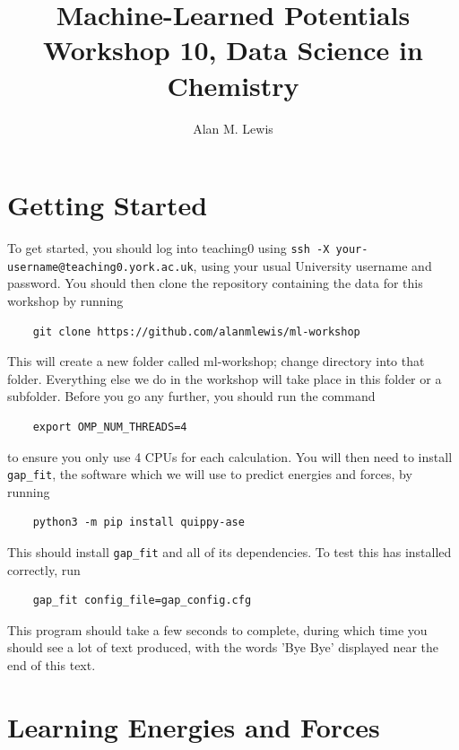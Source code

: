 \documentclass{article}
\title{Machine-Learned Potentials \\ Workshop 10, Data Science in Chemistry}
\author{Alan M. Lewis}
\date{}
\begin{document}
\maketitle

\section{Getting Started}

To get started, you should log into teaching0 using \verb|ssh -X your-username@teaching0.york.ac.uk|, using your usual University username and password. You should then clone the repository containing the data for this workshop by running
\begin{Verbatim}
    git clone https://github.com/alanmlewis/ml-workshop
\end{Verbatim}
This will create a new folder called ml-workshop; change directory into that folder. Everything else we do in the workshop will take place in this folder or a subfolder. Before you go any further, you should run the command
\begin{Verbatim}
    export OMP_NUM_THREADS=4
\end{Verbatim}
to ensure you only use 4 CPUs for each calculation. You will then need to install \verb|gap_fit|, the software which we will use to predict energies and forces, by running
\begin{Verbatim}
    python3 -m pip install quippy-ase
\end{Verbatim}
This should install \verb|gap_fit| and all of its dependencies. To test this has installed correctly, run
\begin{Verbatim}
    gap_fit config_file=gap_config.cfg
\end{Verbatim}
This program should take a few seconds to complete, during which time you should see a lot of text produced, with the words 'Bye Bye' displayed near the end of this text.

\section{Learning Energies and Forces}
\end{document}
